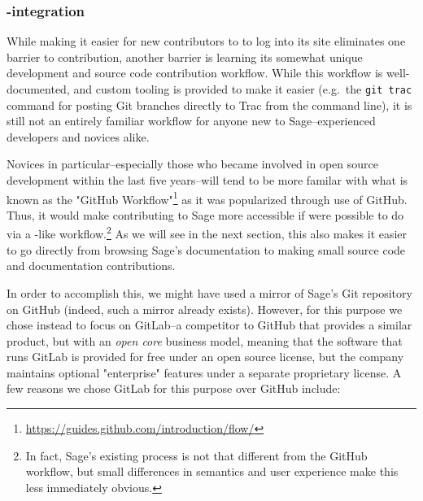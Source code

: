\hypertarget{gitlab-trac-integration}{%
\subsubsection{\GitLab-\Trac integration}\label{gitlab-trac-integration}}

While making it easier for new contributors to \Sage to log into its \Trac site
eliminates one barrier to contribution, another barrier is learning its
somewhat unique development and source code contribution workflow.  While this
workflow is well-documented, and custom tooling is provided to make it easier
(e.g.~the {\tt git trac} command for posting Git branches directly to Trac
from the command line), it is still not an entirely familiar workflow for
anyone new to Sage--experienced developers and novices alike.

Novices in particular--especially those who became involved in open source
development within the last five years--will tend to be more familar with what
is known as the "GitHub
Workflow"\footnote{\url{https://guides.github.com/introduction/flow/}} as it
was popularized through use of GitHub.  Thus, it would make contributing to
Sage more accessible if were possible to do via a \GitHub-like
workflow.\footnote{In fact, Sage's existing process is not that different from
the GitHub workflow, but small differences in semantics and user experience
make this less immediately obvious.}  As we will see in the next section, this
also makes it easier to go directly from browsing Sage's documentation to
making small source code and documentation contributions.

In order to accomplish this, we might have used a mirror of Sage's Git
repository on GitHub (indeed, such a mirror already exists).  However, for this
purpose we chose instead to focus on GitLab--a competitor to GitHub that
provides a similar product, but with an {\em open core} business model, meaning
that the software that runs GitLab is provided for free under an open source
license, but the company maintains optional "enterprise" features under a
separate proprietary license.  A few reasons we chose GitLab for this purpose
over GitHub include:

